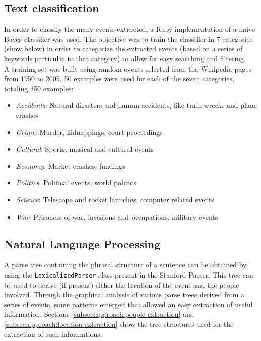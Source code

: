 \documentclass{llncs}
\begin{document}
\subsection{Text classification}
\label{subsec:approach:text-classification}

In order to classify the many events extracted, a Ruby implementation of a naive Bayes classifier\cite{classifier} was used. The objective was to train the classifier in 7 categories (show below) in order to categorize the extracted events (based on a series of keywords particular to that category) to allow for easy searching and filtering.\\

A training set was built using random events selected from the Wikipedia pages from 1950 to 2005. 50 examples were used for each of the seven categories, totaling 350 examples:

\begin{itemize}
	\item \textit{Accidents}: Natural disasters and human accidents, like train wrecks and plane crashes
	\item \textit{Crime}: Murder, kidnappings, court proceedings
	\item \textit{Cultural}: Sports, musical and cultural events
	\item \textit{Economy}: Market crashes, fundings
	\item \textit{Politics}: Political events, world politics
	\item \textit{Science}: Telescope and rocket launches, computer related events
	\item \textit{War}: Prisoners of war, invasions and occupations, military events
\end{itemize}

\subsection{Natural Language Processing}
\label{subsec:approach:nlp}

A parse tree containing the phrasal structure of a sentence can be obtained by using the \verb!LexicalizedParser! class present in the Stanford Parser. This tree can be used to derive (if present) either the location of the event and the people involved. Through the graphical analysis of various parse trees derived from a series of events, some patterns emerged that allowed an easy extraction of useful information. Sections \ref{subsec:approach:people-extraction} and \ref{subsec:approach:location-extraction} show the tree structures used for the extraction of such informations.\cite{santorini}\cite{bies}\\
\end{document}
